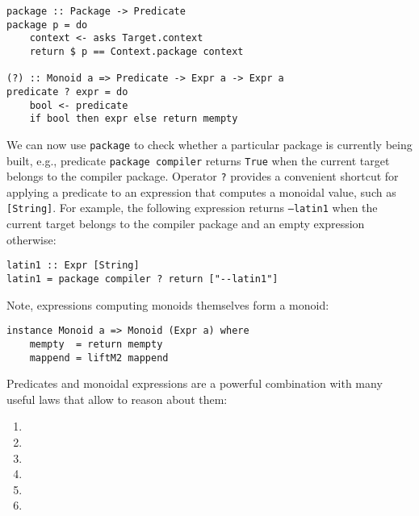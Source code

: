 \begin{lstlisting}[basicstyle=\ttfamily]
package :: Package -> Predicate
package p = do
    context <- asks Target.context
    return $ p == Context.package context

(?) :: Monoid a => Predicate -> Expr a -> Expr a
predicate ? expr = do
    bool <- predicate
    if bool then expr else return mempty
\end{lstlisting}

We can now use \texttt{package} to check whether a particular package is
currently being built, e.g., predicate \texttt{package compiler} returns
\texttt{True} when the current target belongs to the compiler package.
Operator \texttt{?} provides a convenient shortcut for applying a predicate
to an expression that computes a monoidal value, such as \texttt{[String]}. For
example, the following expression returns \texttt{--latin1} when the current
target belongs to the compiler package and an empty expression otherwise:

\begin{lstlisting}[basicstyle=\ttfamily]
latin1 :: Expr [String]
latin1 = package compiler ? return ["--latin1"]
\end{lstlisting}

\noindent Note, expressions computing monoids themselves form a monoid:

\begin{lstlisting}[basicstyle=\ttfamily]
instance Monoid a => Monoid (Expr a) where
    mempty  = return mempty
    mappend = liftM2 mappend
\end{lstlisting}

Predicates and monoidal expressions are a powerful combination with many useful
laws that allow to reason about them:
\begin{enumerate}
  \item {} 
  \item {} 
  \item {} 
  \item {} 
  \item {} 
  \item {} 
\end{enumerate}

